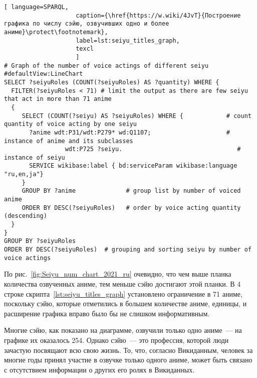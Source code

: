 \begin{fullwidth}
\lstset{numbers=left, firstnumber=1, frame=single}
\begin{lstlisting}[ language=SPARQL, 
                    caption={\href{https://w.wiki/4JvT}{Построение графика по числу сэйю, озвучивших одно и более аниме}\protect\footnotemark},
                    label=lst:seiyu_titles_graph,
                    texcl 
                    ]
# Graph of the number of voice actings of different seiyu
#defaultView:LineChart
SELECT ?seiyuRoles (COUNT(?seiyuRoles) AS ?quantity) WHERE {
  FILTER(?seiyuRoles < 71) # limit the output as there are few seiyu that act in more than 71 anime
  {
     SELECT (COUNT(?seiyu) AS ?seiyuRoles) WHERE {            # count quantity of voice acting by one seiyu
       ?anime wdt:P31/wdt:P279* wd:Q1107;                     # instance of anime and its subclasses
                 wdt:P725 ?seiyu.                                # instance of seiyu
       SERVICE wikibase:label { bd:serviceParam wikibase:language "ru,en,ja"}
     }
     GROUP BY ?anime              # group list by number of voiced anime
     ORDER BY DESC(?seiyuRoles)   # order by voice acting quantity (descending)
  }
}
GROUP BY ?seiyuRoles
ORDER BY DESC(?seiyuRoles)  # grouping and sorting seiyu by number of voice actings
\end{lstlisting}%
\lstset{numbers=none}
\end{fullwidth}

По рис.~\ref{fig:Seiyu_num_chart_2021_ru} очевидно, что чем выше планка количества озвученных аниме, тем меньше сэйю достигают этой планки. В \num{4} строке скрипта~\ref{lst:seiyu_titles_graph} установлено ограничение в \num{71} аниме, поскольку сэйю, которые отметились в большем количестве аниме, единицы, и расширение графика вправо было бы не слишком информативным.

Многие сэйю, как показано на диаграмме, озвучили только одно аниме~--- на графике их оказалось \num{254}. Однако сэйю~--- это профессия, которой люди зачастую посвящают всю свою жизнь. То, что, согласно Викиданным, человек за многие годы принял участие в озвучке только одного аниме, может быть связано с отсутствием информации о других его ролях в Викиданных. 

\begin{figure*}[h]

    \setlength{\fboxsep}{0pt}%
    \setlength{\fboxrule}{1pt}%
	\caption[График числа ролей, озвученных различными сэйю, 2021.]{График числа ролей, озвученных различными сэйю, 2021. График построен на основе данных, полученных с помощью запроса~\protect\ref{lst:seiyu_titles_graph}.}%
    \label{fig:Seiyu_num_chart_2021_ru}%
\end{figure*} 

